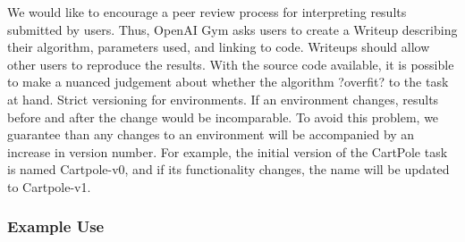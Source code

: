 We would like to encourage a peer review process for interpreting results submitted by users. Thus, OpenAI Gym asks users to create a Writeup describing their algorithm, parameters used, and linking to code. Writeups should allow other users to reproduce the results. With the source code available, it is possible to make a nuanced judgement about whether the algorithm ?overfit? to the task at hand.
Strict versioning for environments. If an environment changes, results before and after the change would be incomparable. To avoid this problem, we guarantee than any changes to an environment will be accompanied by an increase in version number. For example, the initial version of the CartPole task is named Cartpole-v0, and if its functionality changes, the name will be updated to Cartpole-v1.

\subsubsection{Example Use}


%


